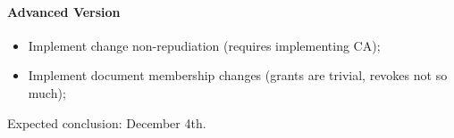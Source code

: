 \paragraph{Advanced Version} {
    \begin{itemize}
        \setlength{\itemsep}{0pt}
        \setlength{\parskip}{0pt}
        \setlength{\parsep}{0pt}
	\item Implement change non-repudiation (requires implementing CA);
	\item Implement document membership changes (grants are trivial, revokes not so much);
    \end{itemize}
    Expected conclusion: December 4th.
}


